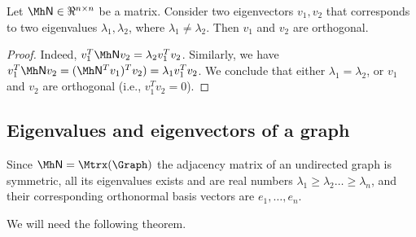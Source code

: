 \begin{lemma}
    Let $\MA \in \Re^{n \times n}$ be a matrix.  Consider two
    eigenvectors $v_1, v_2$ that corresponds to two eigenvalues
    $\lambda_1, \lambda_2$, where $\lambda_1 \neq \lambda_2$. Then
    $v_1$ and $v_2$ are orthogonal.
\end{lemma}
\begin{proof}
    Indeed, $v_1^T \MA v_2 = \lambda_2 v_1^T v_2$. Similarly, we have
    $v_1^T \MA v_2 = (\MA^T v_1)^T v_2) =\lambda_1 v_1^T v_2$. We
    conclude that either $\lambda_1 = \lambda_2$, or $v_1$ and $v_2$
    are orthogonal (i.e., $v_1^T v_2 = 0$).
\end{proof}


\subsection{Eigenvalues and eigenvectors of a graph}

Since $\MA = \Mtrx(\Graph)$ the adjacency matrix of an undirected
graph is symmetric, all its eigenvalues exists and are real numbers
$\lambda_1 \geq \lambda_2 \dots\geq \lambda_n$, and their
corresponding orthonormal basis vectors are $e_1,\ldots, e_n$.



We will
need the following theorem.


